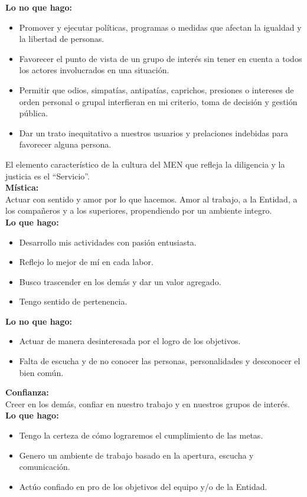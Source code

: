 \textbf{Lo no que hago: }
\begin{itemize}
	\item Promover y ejecutar políticas, programas o medidas que afectan la igualdad y la libertad de personas. 
	\item Favorecer el punto de vista de un grupo de interés sin tener en cuenta a todos los actores involucrados en una situación. 
	\item Permitir que odios, simpatías, antipatías, caprichos, presiones o intereses de orden personal o grupal interfieran en mi criterio, toma de decisión y gestión pública. 
	\item Dar un trato inequitativo a nuestros usuarios y prelaciones indebidas para favorecer alguna persona. 
\end{itemize}

El elemento característico de la cultura del MEN que refleja la diligencia y la justicia es el “Servicio”. \\

\textbf{Mística: } \\
Actuar con sentido y amor por lo que hacemos. Amor al trabajo, a la Entidad, a los compañeros y a los superiores, propendiendo por un ambiente integro. \\

\textbf{Lo que hago: }
\begin{itemize}
	\item Desarrollo mis actividades con pasión entusiasta.  
	\item Reflejo lo mejor de mí en cada labor.  
	\item Busco trascender en los demás y dar un valor agregado. 
	\item Tengo sentido de pertenencia. 
\end{itemize}

\textbf{Lo no que hago: }
\begin{itemize}
	\item Actuar de manera desinteresada por el logro de los objetivos. 
	\item Falta de escucha y de no conocer las personas, personalidades y desconocer el bien común.
\end{itemize}

\textbf{Confianza: } \\
Creer en los demás, confiar en nuestro trabajo y en nuestros grupos de interés. \\

\textbf{Lo que hago: }
\begin{itemize}
	\item Tengo la certeza de cómo lograremos el cumplimiento de las metas. 
	\item Genero un ambiente de trabajo basado en la apertura, escucha y comunicación.  
	\item Actúo confiado en pro de los objetivos del equipo y/o de la Entidad.  
\end{itemize}


